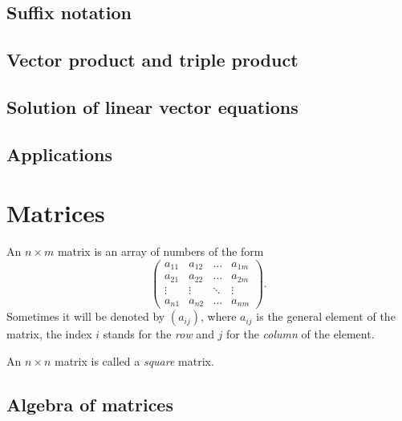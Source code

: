 \documentclass[main.tex]{subfiles}
\begin{document}
		\subsection{Suffix notation}
		
		\subsection{Vector product and triple product}
		
		\subsection{Solution of linear vector equations}
		
		\subsection{Applications}
		
	\section{Matrices}
		\begin{definition}
			An $n \times m$ matrix is an array of numbers of the form
			\begin{equation*}
				\begin{pmatrix}
				a_{11} & a_{12} & \ldots & a_{1m} \\
				a_{21} & a_{22} & \ldots & a_{2m} \\
				\vdots & \vdots & \ddots & \vdots \\
				a_{n1} & a_{n2} & \ldots & a_{nm}
				\end{pmatrix}.
			\end{equation*}
			Sometimes it will be denoted by $(a_{ij})$, where $a_{ij}$ is the general element of the matrix, the index $i$ stands for the \textit{row} and $j$ for the \textit{column} of the element.
		\end{definition}
			\begin{definition}
				An $n \times n$ matrix is called a \textit{square} matrix.
			\end{definition}
		\subsection{Algebra of matrices}
		
\end{document}
